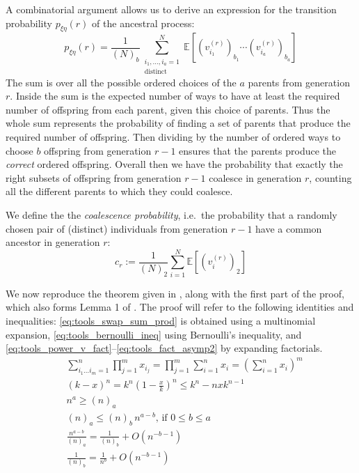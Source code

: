 \documentclass{article}
\newcommand{\E}{\mathbb{E}}
\begin{document}
A combinatorial argument allows us to derive an expression for the transition probability $p_{\xi\eta}(r)$ of the ancestral process:
\begin{equation}\label{eq:trans_prob}
p_{\xi\eta}(r) = \frac{1}{(N)_b} \sum_{\substack{i_1,\dots,i_a =1 \\ \text{distinct}}}^{N} \E\left[(v_{i_1}^{(r)})_{b_1}\cdots (v_{i_a}^{(r)})_{b_a}\right]
\end{equation}
The sum is over all the possible ordered choices of the $a$ parents from generation $r$. Inside the sum is the expected number of ways to have at least the required number of offspring from each parent, given this choice of parents. Thus the whole sum represents the probability of finding a set of parents that produce the required number of offspring. Then dividing by the number of ordered ways to choose $b$ offspring from generation $r-1$ ensures that the parents produce the \emph{correct} ordered offspring. Overall then we have the probability that exactly the right subsets of offspring from generation $r-1$ coalesce in generation $r$, counting all the different parents to which they could coalesce.

We define the the \emph{coalescence probability}, i.e.\ the probability that a randomly chosen pair of (distinct) individuals from generation $r-1$ have a common ancestor in generation $r$:
\begin{equation}
c_r := \frac{1}{(N)_2} \sum_{i=1}^{N} \E \left[ (v_i^{(r)})_2 \right] \label{eq:coal_prob1}
\end{equation}

We now reproduce the theorem given in \citet[Theorem 1]{mohle1998}, along with the first part of the proof, which also forms Lemma 1 of \citet{koskela2018}.
The proof will refer to the following identities and inequalities: \eqref{eq:tools_swap_sum_prod} is obtained using a multinomial expansion, \eqref{eq:tools_bernoulli_ineq} using Bernoulli's inequality, and \eqref{eq:tools_power_v_fact}--\eqref{eq:tools_fact_asymp2} by expanding factorials. 
\begin{align}
& \sum_{i_1\dots i_m = 1}^n \prod_{j=1}^m x_{i_j} = \prod_{j=1}^m \sum_{i=1}^n x_i = \left( \sum_{i=1}^n x_i \right)^m \label{eq:tools_swap_sum_prod}\\
& (k-x)^n = k^n\left(1-\frac{x}{k}\right)^n \leq k^n - nxk^{n-1} \label{eq:tools_bernoulli_ineq}\\
& n^a \geq (n)_a \label{eq:tools_power_v_fact}\\
& (n)_a \leq (n)_b \,n^{a-b} \text{, if } 0\leq b\leq a \label{eq:tools_fact_taketwo_bd}\\
& \frac{n^{a-b}}{(n)_a} = \frac{1}{(n)_b} + O(n^{-b-1}) \label{eq:tools_fact_asymp1}\\
& \frac{1}{(n)_b} = \frac{1}{n^b} + O(n^{-b-1}) \label{eq:tools_fact_asymp2}
\end{align}
\end{document}
